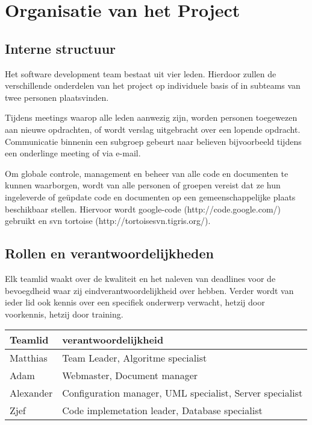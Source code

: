 \documentclass{article}
\begin{document}
\newpage
\section{Organisatie van het Project}


\subsection{Interne structuur}

Het software development team bestaat uit vier leden. Hierdoor zullen de verschillende onderdelen van het project op individuele basis of in subteams  van twee personen plaatsvinden.

Tijdens meetings waarop alle leden aanwezig zijn, worden personen toegewezen aan nieuwe opdrachten, of wordt verslag uitgebracht over een lopende opdracht.
Communicatie binnenin een subgroep gebeurt naar believen bijvoorbeeld tijdens een onderlinge meeting of via e-mail.

Om globale controle, management en beheer van alle code en documenten te kunnen waarborgen, wordt van alle personen of groepen vereist dat ze hun ingeleverde of ge\"{u}pdate code en documenten op een gemeenschappelijke plaats beschikbaar stellen.
Hiervoor wordt google-code (http://code.google.com/) gebruikt en svn tortoise (http://tortoisesvn.tigris.org/).

\subsection{Rollen en verantwoordelijkheden}

Elk teamlid waakt over de kwaliteit en het naleven van deadlines voor de bevoegdheid waar zij eindverantwoordelijkheid over hebben.
Verder wordt van ieder lid ook kennis over een specifiek onderwerp verwacht, hetzij door voorkennis, hetzij door training.

\begin{center}
\begin{tabular}[t]{|l|l|}
\hline
Teamlid & verantwoordelijkheid \\
\hline
\hline
Matthias & Team Leader, Algoritme specialist \\
\hline
Adam & Webmaster, Document manager \\
\hline
Alexander & Configuration manager, UML specialist, Server specialist \\
\hline
Zjef & Code implemetation leader, Database specialist  \\
\hline
\end{tabular}
\end{center}
\end{document}
